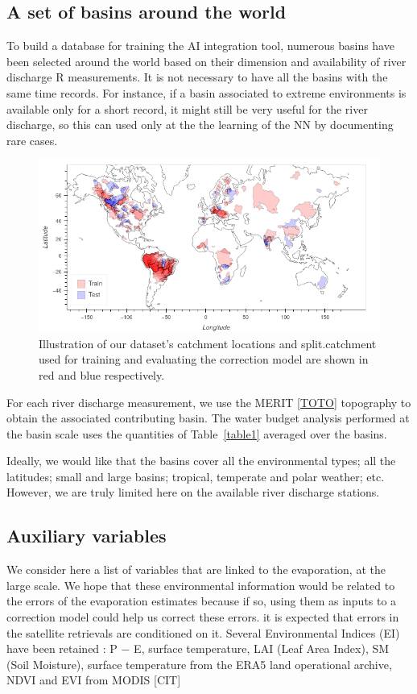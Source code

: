 \documentclass[draft]{agujournal2019}
\begin{document}
\subsection{A set of basins around the world}
\label{def_basins}
To build a database for training the AI integration tool, numerous basins have been selected around the world based on their dimension and availability of river discharge R measurements. 
It is not necessary to have all the basins with the same time records. 
For instance, if a basin associated to extreme environments is available only for a short record, it might still be very useful for the river discharge, so this can used only at the the learning of the NN by documenting rare cases. 


\begin{figure}[h]
\centering
\includegraphics[width=\textwidth]{figure1}
\caption{Illustration of our dataset's catchment locations and split.catchment used for training and evaluating the correction model are shown in red and blue respectively.}
\end{figure}





For each river discharge measurement, we use the MERIT \ref{TOTO} topography to obtain the associated contributing basin. The water budget analysis performed at the basin scale uses the quantities of Table~\ref{table1} averaged over the basins.

Ideally, we would like that the basins cover all the environmental types; all the latitudes; small and large basins; tropical, temperate and polar weather; etc. However, we are truly limited here on the available river discharge stations. 

\subsection{Auxiliary variables}
\label{auxiliary_info}
We consider here a list of variables that are linked to the evaporation, at the large scale. We hope that these environmental information would be related to the errors of the evaporation estimates because if so, using them as inputs to a correction model could help us correct these errors. it is expected that errors in the satellite retrievals are conditioned on it.  Several Environmental Indices (EI) have been retained : P − E, surface temperature, LAI (Leaf Area Index), SM (Soil Moisture), surface temperature from the ERA5 land operational archive, NDVI and EVI from MODIS [CIT]
\end{document}
